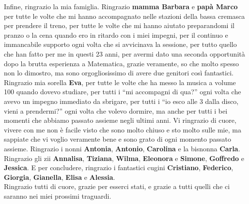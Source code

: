 \noindent Infine, ringrazio la mia famiglia. Ringrazio \textbf{mamma Barbara} e \textbf{papà Marco} per tutte le volte che mi hanno accompagnato nelle stazioni della bassa cremasca per prendere il treno, per tutte le volte che mi hanno aiutato preparandomi il pranzo o la cena quando ero in ritardo con i miei impegni, per il continuo e immancabile supporto ogni volta che si avvicinava la sessione, per tutto quello che han fatto per me in questi 23 anni, per avermi dato una seconda opportunità dopo la brutta esperienza a Matematica, grazie veramente, so che molto spesso non lo dimostro, ma sono orgogliosissimo di avere due genitori così fantastici. Ringrazio mia sorella \textbf{Eva}, per tutte le volte che ha messo la musica a volume 100 quando dovevo studiare, per tutti i ``mi accompagni di qua?'' ogni volta che avevo un impegno immediato da sbrigare, per tutti i ``io esco alle 3 dalla disco, vieni a prendermi?'' ogni volta che volevo dormire, ma anche per tutti i bei momenti che abbiamo passato assieme negli ultimi anni. Vi ringrazio di cuore, vivere con me non è facile visto che sono molto chiuso e sto molto sulle mie, ma sappiate che vi voglio veramente bene e sono grato di ogni momento passato assieme. Ringrazio i nonni \textbf{Antonia}, \textbf{Antonio}, \textbf{Carolina} e la bisnonna \textbf{Carla}. Ringrazio gli zii \textbf{Annalisa}, \textbf{Tiziana}, \textbf{Wilma}, \textbf{Eleonora} e \textbf{Simone}, \textbf{Goffredo} e \textbf{Jessica}. E per concludere, ringrazio i fantastici cugini \textbf{Cristiano}, \textbf{Federico}, \textbf{Giorgia}, \textbf{Gianella}, \textbf{Elisa} e \textbf{Alessia}. \\

\noindent Ringrazio tutti di cuore, grazie per esserci stati, e grazie a tutti quelli che ci saranno nei miei prossimi traguardi.

